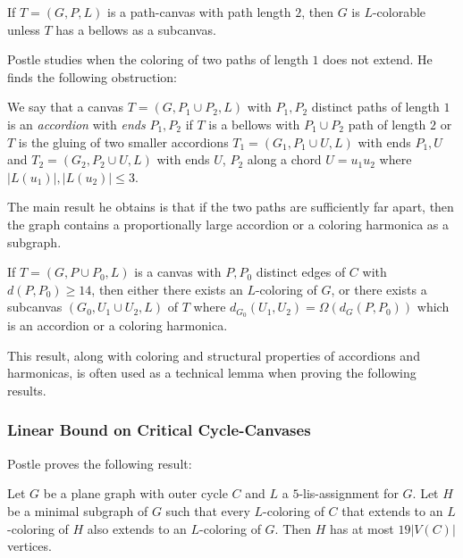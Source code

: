 

\begin{theorem}
	If $T = (G, P, L)$ is a path-canvas with path length $2$, then $G$ is $L$-colorable unless $T$ has a bellows as a subcanvas.
\end{theorem}

Postle studies when the coloring of two paths of length $1$ does not extend. He finds the following obstruction:

\begin{definition}[Accordion]
	We say that a canvas $T = (G, P_1 \cup P_2, L)$ with $P_1, P_2$ distinct paths of length $1$ is an \emph{accordion} with \emph{ends} $P_1, P_2$ if $T$ is a bellows with $P_1 \cup P_2$ path of length $2$ or $T$ is the gluing of two smaller accordions $T_1 = (G_1, P_1 \cup U, L)$ with ends $P_1, U$ and $T_2 = (G_2, P_2 \cup U, L)$ with ends $U$, $P_2$ along a chord $U = u_1u_2$ where $|L(u_1)|, |L(u_2)| \leq 3$.
\end{definition}

The main result he obtains is that if the two paths are sufficiently far apart, then the graph contains a proportionally large accordion or a coloring harmonica as a subgraph.

\begin{theorem}
\label{bottlenecktheorem}
If $T = (G, P \cup P_0 , L)$ is a canvas with $P, P_0$ distinct edges of $C$ with $d(P, P_0) \geq 14$, then either there exists an $L$-coloring of $G$, or there exists a subcanvas $(G_0 , U_1 \cup U_2 , L)$ of $T$ where $d_{G_0} (U_1, U_2) = \Omega(d_G (P, P_0))$ which is an accordion or a coloring harmonica.
\end{theorem}

This result, along with coloring and structural properties of accordions and harmonicas, is often used as a technical lemma when proving the following results.

\subsubsection{Linear Bound on Critical Cycle-Canvases}

Postle proves the following result:

\begin{theorem}
\label{linearboundcycletheorem}
Let $G$ be a plane graph with outer cycle $C$ and $L$ a $5$-lis-assignment for $G$. Let $H$ be a minimal subgraph of $G$ such that every $L$-coloring of $C$ that extends to an $L$-coloring of $H$ also extends to an $L$-coloring of $G$. Then $H$ has at most $19|V(C)|$ vertices.
\end{theorem}

